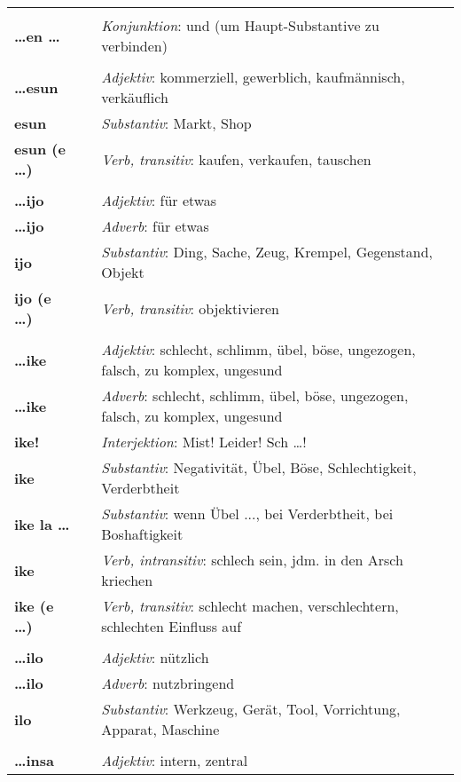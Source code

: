 \begin{supertabular}{p{2,5cm}|ll}
 && \\ %
\textbf{\dots en \dots} && \textit{Konjunktion}:  und (um Haupt-Substantive zu verbinden) \\ 
 && \\ %
\textbf{\dots esun} && \textit{Adjektiv}: kommerziell, gewerblich, kaufmännisch, verkäuflich \\ 
\textbf{esun} && \textit{Substantiv}: Markt, Shop \\ 
\textbf{esun (e \dots)} && \textit{Verb, transitiv}: kaufen, verkaufen, tauschen \\ 
 && \\ %
\textbf{\dots ijo} && \textit{Adjektiv}: für etwas \\ 
\textbf{\dots ijo} && \textit{Adverb}: für etwas \\ 
\textbf{ijo} && \textit{Substantiv}: Ding, Sache, Zeug, Krempel, Gegenstand, Objekt \\ 
\textbf{ijo (e \dots)} && \textit{Verb, transitiv}: objektivieren \\ 
 && \\ %
\textbf{\dots ike} && \textit{Adjektiv}: schlecht, schlimm, übel, böse, ungezogen, falsch, zu komplex, ungesund \\ 
\textbf{\dots ike} && \textit{Adverb}: schlecht, schlimm, übel, böse, ungezogen, falsch, zu komplex, ungesund \\ 
\textbf{ike!} && \textit{Interjektion}: Mist! Leider! Sch \dots ! \\ 
\textbf{ike} && \textit{Substantiv}: Negativität, Übel, Böse, Schlechtigkeit, Verderbtheit \\ 
\textbf{ike la \dots} && \textit{Substantiv}: wenn Übel ..., bei Verderbtheit, bei Boshaftigkeit \\ 
\textbf{ike} && \textit{Verb, intransitiv}: schlech sein, jdm. in den Arsch kriechen \\ 
\textbf{ike (e \dots)} && \textit{Verb, transitiv}: schlecht machen, verschlechtern, schlechten Einfluss auf \\ 
 && \\ %
\textbf{\dots ilo} && \textit{Adjektiv}: nützlich \\ 
\textbf{\dots ilo} && \textit{Adverb}: nutzbringend \\ 
\textbf{ilo} && \textit{Substantiv}: Werkzeug, Gerät, Tool, Vorrichtung, Apparat, Maschine \\ 
 && \\ %
\textbf{\dots insa} && \textit{Adjektiv}: intern, zentral \\ 

\end{supertabular}
